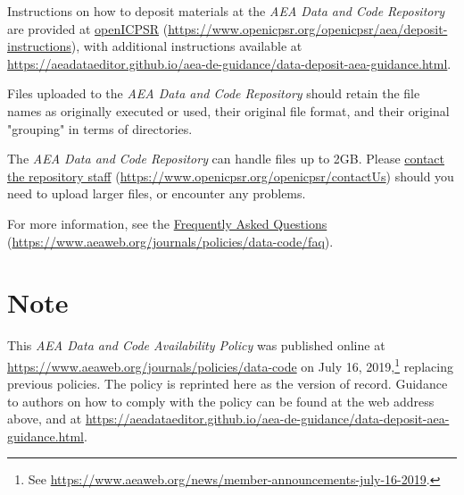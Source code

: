 \documentclass[PP]{AEA}
\newcommand{\Href}[2]{\href{#1}{#2} (\url{#1})}
\begin{document}
Instructions on how to deposit materials at the \textit{AEA Data and Code Repository} are provided at \Href{https://www.openicpsr.org/openicpsr/aea/deposit-instructions}{openICPSR}, with additional instructions available at \url{https://aeadataeditor.github.io/aea-de-guidance/data-deposit-aea-guidance.html}.

Files uploaded to the \textit{AEA Data and Code Repository} should retain the file names as originally executed or used, their original file format, and their original "grouping" in terms of directories.

The \textit{AEA Data and Code Repository} can handle files up to 2GB. Please \Href{https://www.openicpsr.org/openicpsr/contactUs}{contact the repository staff} should you need to upload larger files, or encounter any problems.


For more information, see the \Href{https://www.aeaweb.org/journals/policies/data-code/faq}{Frequently Asked Questions}.

\appendix 
\section{Note}
This  \textit{AEA Data and Code Availability Policy} was published online at \url{https://www.aeaweb.org/journals/policies/data-code} on July 16, 2019,\footnote{See \url{https://www.aeaweb.org/news/member-announcements-july-16-2019}.} replacing previous policies. The policy is reprinted here as the version of record. Guidance to authors on how to comply with the policy can be found at the web address above, and at \url{https://aeadataeditor.github.io/aea-de-guidance/data-deposit-aea-guidance.html}. 

%
%


\end{document}
